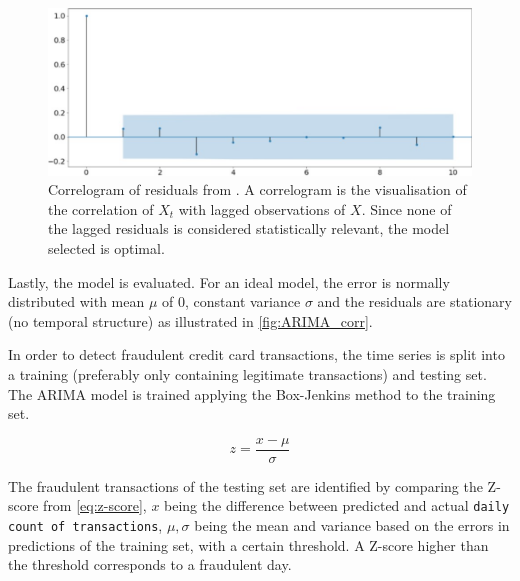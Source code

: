 \begin{figure}[http]
    \begin{center}
      \includegraphics[scale=0.25]{images/ARIMA_correlogram_white_noise.jpg}
      \caption{Correlogram of residuals from \cite{fd_ARIMA}. A correlogram is the visualisation of the correlation of $X_t$ with lagged observations of $X$. Since none of the lagged residuals is considered statistically relevant, the model selected is optimal.}
      \label{fig:ARIMA_corr}
    \end{center}
\end{figure}

Lastly, the model is evaluated. For an ideal model, the error is normally distributed with mean $\mu$ of 0, constant variance $\sigma$ and the residuals are stationary (no temporal structure) as illustrated in \autoref{fig:ARIMA_corr}.

In order to detect fraudulent credit card transactions, the time series is split into a training (preferably only containing legitimate transactions) and testing set. 
The \ac{ARIMA} model is trained applying the Box-Jenkins method to the training set.
%
\begin{ceqn}
    \begin{equation}
    \label{eq:z-score}
        z = \frac{x-\mu}{\sigma}
    \end{equation}
\end{ceqn}
%
The fraudulent transactions of the testing set are identified by comparing the Z-score from \eqref{eq:z-score}, $x$ being the difference between predicted and actual \texttt{daily count of transactions}, $\mu, \sigma$ being the mean and variance based on the errors in predictions of the training set, with a certain threshold. A Z-score higher than the threshold corresponds to a fraudulent day.

